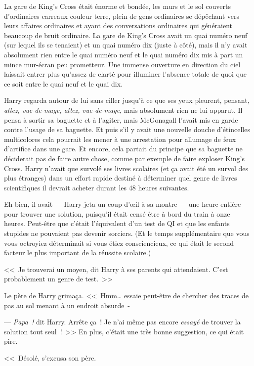 La gare de King's Cross était énorme et bondée, les murs et le sol couverts d'ordinaires carreaux couleur terre, plein de gens ordinaires se dépêchant vers leurs affaires ordinaires et ayant des conversations ordinaires qui généraient beaucoup de bruit ordinaire. La gare de King's Cross avait un quai numéro neuf (sur lequel ils se tenaient) et un quai numéro dix (juste à côté), mais il n'y avait absolument rien entre le quai numéro neuf et le quai numéro dix mis à part un mince mur-écran peu prometteur. Une immense ouverture en direction du ciel laissait entrer plus qu'assez de clarté pour illuminer l'absence totale de quoi que ce soit entre le quai neuf et le quai dix.

Harry regarda autour de lui sans ciller jusqu'à ce que ses yeux pleurent, pensant, \emph{allez, vue-de-mage, allez, vue-de-mage}, mais absolument rien ne lui apparut. Il pensa à sortir sa baguette et à l'agiter, mais McGonagall l'avait mis en garde contre l'usage de sa baguette. Et puis s'il y avait une nouvelle douche d'étincelles multicolores cela pourrait les mener à une arrestation pour allumage de feux d'artifice dans une gare. Et encore, cela partait du principe que sa baguette ne déciderait pas de faire autre chose, comme par exemple de faire exploser King's Cross. Harry n'avait que survolé ses livres scolaires (et ça avait été un survol des plus étranges) dans un effort rapide destiné à déterminer quel genre de livres scientifiques il devrait acheter durant les 48 heures suivantes.

Eh bien, il avait — Harry jeta un coup d'œil à sa montre — une heure entière pour trouver une solution, puisqu'il était censé être à bord du train à onze heures. Peut-être que c'était l'équivalent d'un test de QI et que les enfants stupides ne pouvaient pas devenir sorciers. (Et le temps supplémentaire que vous vous octroyiez déterminait si vous étiez consciencieux, ce qui était le second facteur le plus important de la réussite scolaire.)

<<~Je trouverai un moyen, dit Harry à ses parents qui attendaient. C'est probablement un genre de test.~>>

Le père de Harry grimaça. <<~Hmm… essaie peut-être de chercher des traces de pas au sol menant à un endroit absurde~-

--- \emph{Papa~!} dit Harry. Arrête ça~! Je n'ai même pas encore \emph{essayé} de trouver la solution tout seul~!~>> En plus, c'était une très bonne suggestion, ce qui était pire.

<<~Désolé, s'excusa son père.

